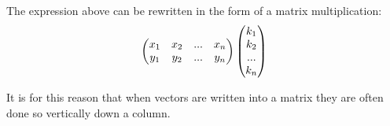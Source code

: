 \documentclass{article}
\begin{document}
\par \noindent The expression above can be rewritten in the form of a matrix multiplication:
\[
\left(\begin{array}{@{}cccc@{}}
	x_1 & x_2 & ... &x_n\\
	y_1 & y_2 & ... &y_n\\
	
\end{array}\right) 
\left(\begin{array}{@{}c@{}}
	k_1 \\
	k_2 \\
	... \\
	k_n
\end{array}\right) 
\]
\par \noindent It is for this reason that when vectors are written into a matrix they are often done so vertically down a column.
\end{document}
